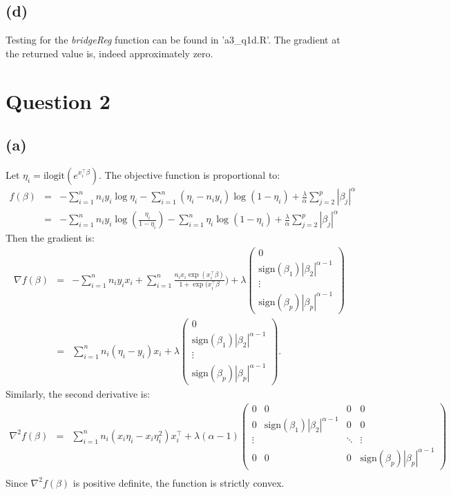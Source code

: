 \documentclass{article}\usepackage[]{graphicx}\usepackage[]{color}
\begin{document}
\subsection*{(d)}
Testing for the \emph{bridgeReg} function can be found in 'a3\_q1d.R'.  The gradient at the returned value is, indeed approximately zero.

\section*{Question 2}
\subsection*{(a)}
Let $\eta_i=\mbox{ilogit}(e^{x_i^\top\beta})$. The objective function is proportional to:
\begin{eqnarray*}
 f(\beta) &=& -\sum_{i=1}^n n_i y_i \log\eta_i - \sum_{i=1}^n(\eta_i-n_i y_i)\log(1-\eta_i) + \frac{\lambda}{\alpha}\sum_{j=2}^p |\beta_j|^\alpha \\
 &=& -\sum_{i=1}^n n_i y_i \log\left(\frac{\eta_i}{1-\eta_i}\right) - \sum_{i=1}^n\eta_i\log(1-\eta_i) + \frac{\lambda}{\alpha}\sum_{j=2}^p |\beta_j|^\alpha
\end{eqnarray*}
Then the gradient is:
\begin{eqnarray*}
 \nabla f(\beta) &=& -\sum_{i=1}^n n_i y_i x_i  + \sum_{i=1}^n \frac{n_i x_i \exp(x_i^\top \beta)}{1+\exp(x_i^\top \beta}) + \lambda \left( \begin{array}{c}
 0 \\
\mbox{sign}(\beta_1) |\beta_2|^{\alpha-1}  \\
\vdots  \\
\mbox{sign}(\beta_p) |\beta_p|^{\alpha-1}  \end{array} \right) \\
&=& \sum_{i=1}^n n_i(\eta_i-y_i)x_i + \lambda \left( \begin{array}{c}
 0 \\
\mbox{sign}(\beta_1) |\beta_2|^{\alpha-1}  \\
\vdots  \\
\mbox{sign}(\beta_p) |\beta_p|^{\alpha-1}  \end{array} \right).
\end{eqnarray*}
Similarly, the second derivative is:
\begin{eqnarray*}
 \nabla^2 f(\beta) &=& \sum_{i=1}^n n_i(x_i\eta_i-x_i\eta_i^2)x_i^\top + \lambda(\alpha-1) \left( \begin{array}{cccc}
 0 & 0 & 0 & 0\\
 0 & \mbox{sign}(\beta_1) |\beta_2|^{\alpha-1} & 0 & 0  \\
 \vdots & & \ddots & \vdots \\
 0 & 0 & 0 & \mbox{sign}(\beta_p) |\beta_p|^{\alpha-1}  \end{array} \right) \\
\end{eqnarray*}
Since $\nabla^2 f(\beta)$ is positive definite, the function is strictly convex.
\end{document}
